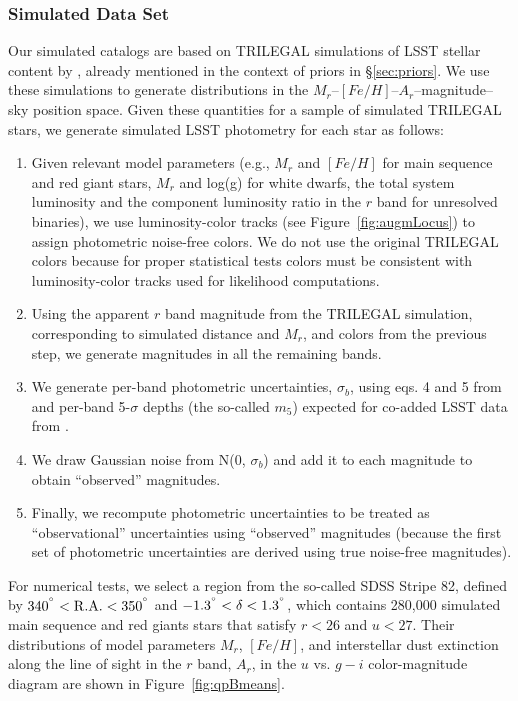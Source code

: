 \subsubsection{Simulated Data Set}
 
Our simulated catalogs are based on TRILEGAL simulations of LSST stellar content by \cite{2022ApJS..262...22D}, already
mentioned in the context of priors in \S\ref{sec:priors}. We use these simulations to generate distributions in the
$M_r$--$[Fe/H]$--$A_r$--magnitude--sky position space. Given these quantities for a sample of simulated TRILEGAL stars,
we generate simulated LSST photometry for each star as follows: 
\begin{enumerate}
\item
Given relevant model parameters (e.g., $M_r$ and $[Fe/H]$ for main sequence and red giant stars, $M_r$ and log(g) for
white dwarfs, the total system luminosity and the component luminosity ratio in the $r$ band for unresolved binaries),
we use luminosity-color tracks (see Figure~\ref{fig:augmLocus}) to
assign photometric noise-free colors. We do not use the original TRILEGAL
colors because for proper statistical tests colors must be consistent
with luminosity-color tracks used for likelihood computations. 
\item
Using the apparent $r$ band magnitude from the TRILEGAL simulation, corresponding to simulated distance and $M_r$, and 
colors from the previous step, we generate magnitudes in all the remaining bands.
\item
We generate per-band photometric uncertainties, $\sigma_b$, using eqs. 4 and 5 from \cite{2019ApJ...873..111I} and
per-band 5-$\sigma$ depths (the so-called $m_5$) expected for co-added LSST data from \cite{2022ApJS..258....1B}.
\item
We draw Gaussian noise from N(0, $\sigma_b$) and add it to each magnitude to obtain ``observed'' magnitudes.   
\item
Finally, we recompute photometric uncertainties to be treated as ``observational'' uncertainties using ``observed'' magnitudes
(because the first set of photometric uncertainties are derived using true noise-free magnitudes). 
\end{enumerate} 

For numerical tests, we select a region from the so-called SDSS Stripe 82, defined by $340^{\degree} < {\rm R.A.} < 350^{\degree}$ and
$-1.3^{\degree} < \delta < 1.3^{\degree}$, which contains 280,000 simulated main sequence and red giants stars that satisfy
$r<26$ and $u<27$. Their distributions of model parameters $M_r$, $[Fe/H]$, and interstellar dust extinction along the line of sight in
the $r$ band, $A_r$,  in the $u$ vs. $g-i$ color-magnitude diagram are shown in Figure~\ref{fig:qpBmeans}. 

